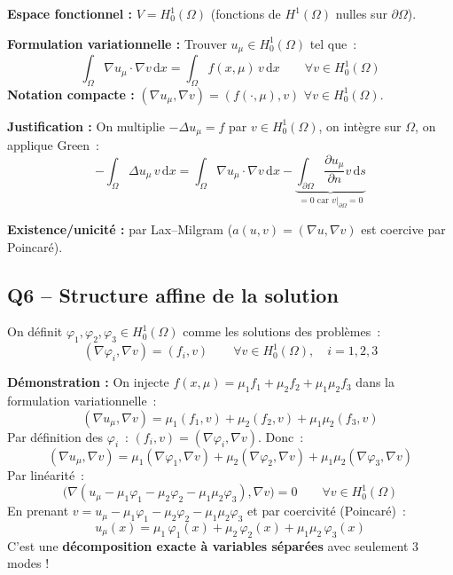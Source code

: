 \documentclass[11pt,a4paper]{article}
\begin{document}
\begin{formulabox}[Solution]
\textbf{Espace fonctionnel :} $V = H^1_0(\Omega)$ (fonctions de $H^1(\Omega)$ nulles sur $\partial\Omega$).

\textbf{Formulation variationnelle :} Trouver $u_\mu \in H^1_0(\Omega)$ tel que~:
\[
\boxed{\int_\Omega \nabla u_\mu \cdot \nabla v\,\mathrm{d}x = \int_\Omega f(x,\mu)\, v\,\mathrm{d}x \qquad \forall v \in H^1_0(\Omega)}
\]
\textbf{Notation compacte :} $(\nabla u_\mu, \nabla v) = (f(\cdot,\mu), v)$ \quad $\forall v \in H^1_0(\Omega)$.

\medskip
\textbf{Justification :} On multiplie $-\Delta u_\mu = f$ par $v \in H^1_0(\Omega)$, on int\`egre sur $\Omega$, on applique Green~:
\[
-\int_\Omega \Delta u_\mu\, v\,\mathrm{d}x = \int_\Omega \nabla u_\mu\cdot\nabla v\,\mathrm{d}x - \underbrace{\int_{\partial\Omega}\frac{\partial u_\mu}{\partial n}v\,\mathrm{d}s}_{= 0 \text{ car } v|_{\partial\Omega}=0}
\]

\textbf{Existence/unicit\'e :} par Lax--Milgram ($a(u,v) = (\nabla u, \nabla v)$ est coercive par Poincar\'e).
\end{formulabox}

\subsection{Q6 -- Structure affine de la solution}

\begin{formulabox}
On d\'efinit $\varphi_1, \varphi_2, \varphi_3 \in H^1_0(\Omega)$ comme les solutions des probl\`emes~:
\[
(\nabla\varphi_i, \nabla v) = (f_i, v) \qquad \forall v \in H^1_0(\Omega), \quad i = 1,2,3
\tag{4}
\]

\textbf{D\'emonstration :} On injecte $f(x,\mu) = \mu_1 f_1 + \mu_2 f_2 + \mu_1\mu_2 f_3$ dans la formulation variationnelle~:
\[
(\nabla u_\mu, \nabla v) = \mu_1(f_1, v) + \mu_2(f_2, v) + \mu_1\mu_2(f_3, v)
\]
Par d\'efinition des $\varphi_i$~: $(f_i, v) = (\nabla\varphi_i, \nabla v)$. Donc~:
\[
(\nabla u_\mu, \nabla v) = \mu_1(\nabla\varphi_1, \nabla v) + \mu_2(\nabla\varphi_2, \nabla v) + \mu_1\mu_2(\nabla\varphi_3, \nabla v)
\]
Par lin\'earit\'e~:
\[
\big(\nabla(u_\mu - \mu_1\varphi_1 - \mu_2\varphi_2 - \mu_1\mu_2\varphi_3), \nabla v\big) = 0 \qquad \forall v \in H^1_0(\Omega)
\]
En prenant $v = u_\mu - \mu_1\varphi_1 - \mu_2\varphi_2 - \mu_1\mu_2\varphi_3$ et par coercivit\'e (Poincar\'e)~:
\[
\boxed{u_\mu(x) = \mu_1\,\varphi_1(x) + \mu_2\,\varphi_2(x) + \mu_1\mu_2\,\varphi_3(x)}
\tag{3}
\]
C'est une \textbf{d\'ecomposition exacte \`a variables s\'epar\'ees} avec seulement 3 modes !
\end{formulabox}
\end{document}
